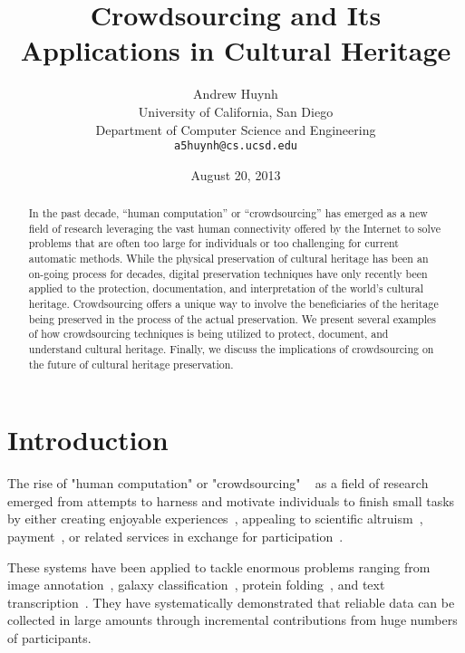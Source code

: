 \documentclass[10pt,twocolumn]{article}
\begin{document}
\title{
	Crowdsourcing and Its Applications in Cultural Heritage}

\author{
	Andrew Huynh\\
	University of California, San Diego\\
	Department of Computer Science and Engineering\\
	\texttt{a5huynh@cs.ucsd.edu}}

\date{August 20, 2013}

\maketitle

\begin{abstract}
In the past decade, ``human computation'' or ``crowdsourcing'' has emerged as 
a new field of research leveraging the vast human connectivity offered by 
the Internet to solve problems that are often too large for individuals or 
too challenging for current automatic methods. While the physical preservation 
of cultural heritage has been an on-going process for decades, digital 
preservation techniques have only recently been applied to the protection, 
documentation, and interpretation of the world's cultural heritage. 
Crowdsourcing offers a unique way to involve the beneficiaries of the heritage 
being preserved in the process of the actual preservation. We present several 
examples of how crowdsourcing techniques is being utilized to protect, 
document, and understand cultural heritage. Finally, we discuss the 
implications of crowdsourcing on the future of cultural heritage preservation.
\end{abstract}

\section{Introduction}
The rise of "human computation" or "crowdsourcing" ~\cite{Howe2006} as a field
of research emerged from attempts to harness and motivate individuals to finish
small tasks by either creating enjoyable experiences~\cite{VonAhn2008}, 
appealing to scientific altruism~\cite{Cooper2010}, payment~\cite{Kittur2008},
or related services in exchange for participation~\cite{Hull2006}. 

These systems have been applied to tackle enormous problems ranging from image 
annotation~\cite{VonAhn2004}, galaxy classification~\cite{Lintott2008}, protein 
folding~\cite{Cooper2010}, and text transcription~\cite{VonAhn2008}. 
They have systematically demonstrated that reliable data can be collected in 
large amounts through incremental contributions from huge numbers of participants.
\end{document}
